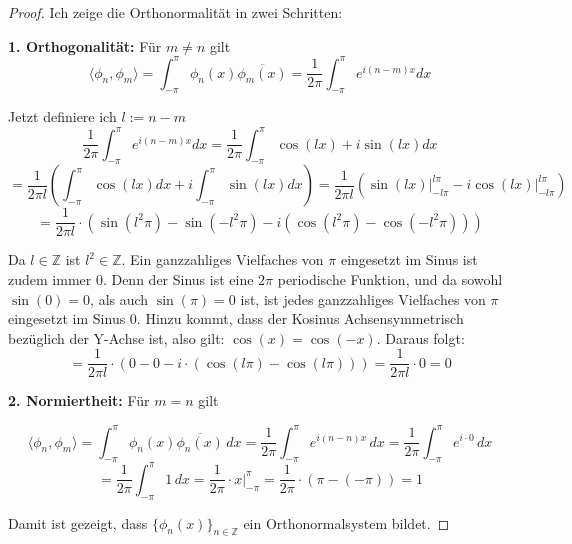 \documentclass[a4paper,12pt]{article}
\theoremstyle{definition}
\theoremstyle{remark}
\begin{document}
\begin{proof}
Ich zeige die Orthonormalität in zwei Schritten: 
            
\textbf{1. Orthogonalität:}  
Für $m \neq n$ gilt
$$\langle \phi_n, \phi_m \rangle = \int_{-\pi}^{\pi}{\phi_n(x) \overline{\phi_m(x)}} = \frac{1}{2\pi}\int_{-\pi}^\pi{e^{i(n-m)x}dx}$$
        
Jetzt definiere ich $l := n-m$
\[\frac{1}{2\pi}\int_{-\pi}^\pi{e^{i(n-m)x}dx} = \frac{1}{2\pi}\int_{-\pi}^\pi{\cos(lx) + i \sin (lx)} dx\] 
\[= \frac{1}{2\pi l}\left(\int_{-\pi}^\pi{\cos (lx) dx} + i\int_{-\pi}^\pi{ \sin (lx) dx} \right)  = \frac{1}{2\pi l} \left(\sin(lx)\big|_{-l\pi}^{l\pi} - i\cos(lx)\big|_{-l\pi}^{l\pi} \right)\]
\[= \frac{1}{2\pi l} \cdot \left(\sin(l^2\pi) - \sin(-l^2\pi) - i\left(\cos(l^2\pi) - \cos(-l^2\pi)\right)\right) \]
        
Da $l\in \mathbb{Z}$ ist $l^2 \in \mathbb{Z}$. Ein ganzzahliges Vielfaches von $\pi$
eingesetzt im Sinus ist zudem immer 0. Denn der Sinus ist eine $2\pi$ periodische Funktion, und da
sowohl $\sin(0) = 0$, als auch $\sin (\pi) = 0$ ist, ist jedes ganzzahliges Vielfaches von $\pi$ eingesetzt 
im Sinus 0. Hinzu kommt, dass der Kosinus Achsensymmetrisch bezüglich der Y-Achse ist, also gilt:
$\cos (x) =  \cos (-x)$. Daraus folgt:
\[= \frac{1}{2\pi l} \cdot (0 - 0 - i\cdot(\cos(l\pi) - \cos(l\pi))) = \frac{1}{2\pi l} \cdot 0 = 0\]      
        
\textbf{2. Normiertheit:}  
Für $m = n$ gilt
        
\[\langle \phi_n, \phi_m \rangle = \int_{-\pi}^{\pi} \phi_n(x) \overline{\phi_n(x)} \, dx = \frac{1}{2\pi} \int_{-\pi}^{\pi} e^{i(n -n) x}\, dx = \frac{1}{2\pi} \int_{-\pi}^{\pi} e^{i\cdot0} \, dx\]        
\[= \frac{1}{2\pi} \int_{-\pi}^{\pi} 1 \, dx = \frac{1}{2\pi} \cdot x \Big|_{-\pi}^{\pi} = \frac{1}{2\pi} \cdot (\pi-(-\pi)) = 1\]
        
Damit ist gezeigt, dass $\{\phi_n(x)\}_{n\in\mathbb{Z}}$ ein Orthonormalsystem bildet.
\end{proof}
\end{document}
